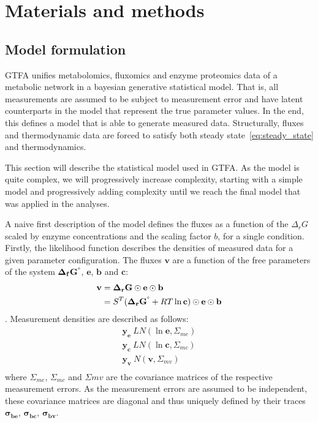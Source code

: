 \documentclass[10pt,letterpaper]{article}
\newcommand{\sdgf}{\Delta_fG^{\degree}}
\newcommand{\dgr}{\Delta_rG}
\newcommand{\sdgr}{\Delta_rG^{\degree}}
\newcommand{\bsdgf}{\mathbf{\sdgf}}
\newcommand{\bdgr}{\mathbf{\dgr}}
\newcommand{\bsdgr}{\mathbf{\sdgr}}
\newcommand{\be}{\mathbf{e}}
\newcommand{\bc}{\mathbf{c}}
\newcommand{\bb}{\mathbf{b}}
\newcommand{\bv}{\mathbf{v}}
\begin{document}

\section*{Materials and methods}

\subsection{Model formulation}
GTFA unifies metabolomics, fluxomics and enzyme proteomics data of a metabolic network in a bayesian generative statistical model.
That is, all measurements are assumed to be subject to measurement error and have latent counterparts in the model that represent the true parameter values.
In the end, this defines a model that is able to generate measured data.
Structurally, fluxes and thermodynamic data are forced to satisfy both steady state~\ref{eq:steady_state} and thermodynamics.

This section will describe the statistical model used in GTFA.
As the model is quite complex, we will progressively increase complexity, starting with a simple model and progressively adding complexity until we reach the final model that was applied in the analyses.

A naive first description of the model defines the fluxes as a function of the $\dgr$ scaled by enzyme concentrations and the scaling factor $b$, for a single condition.
Firstly, the likelihood function describes the densities of measured data for a given parameter configuration.
The fluxes $\bv$ are a function of the free parameters of the system $\bsdgf$, $\be$, $\bb$ and $\bc$:
\begin{align}
    \bv &= \bdgr \odot \be \odot \bb \\
        &= S^T (\bsdgr + RT\ln{\bc}) \odot \be \odot \bb \\
\end{align}
.
Measurement densities are described as follows:
\begin{align*}
    \mathbf{y_{e}} ~ LN(\ln{\be}, \Sigma_{me}) \\
    \mathbf{y_{c}} ~ LN(\ln{\bc}, \Sigma_{mc}) \\
    \mathbf{y_{v}} ~ N(\bv, \Sigma_{mv}) \\
\end{align*}
where $\Sigma_{me}$, $\Sigma_{mc}$ and $\Sigma{mv}$ are the covariance matrices of the respective measurement errors.
As the measurement errors are assumed to be independent, these covariance matrices are diagonal and thus uniquely defined by their traces $\mathbf{\sigma_{be}}$, $\mathbf{\sigma_{bc}}$, $\mathbf{\sigma_{bv}}$.
\end{document}
